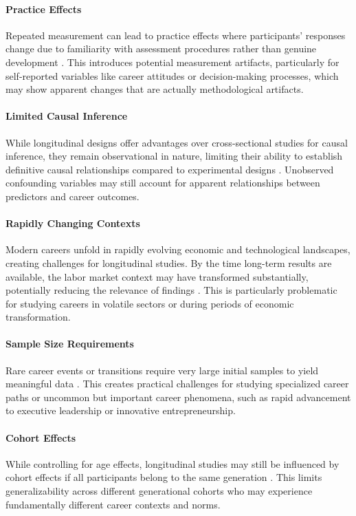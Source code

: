 \documentclass[../main.tex]{subfiles}
\begin{document}
\paragraph{Practice Effects}
Repeated measurement can lead to practice effects where participants' responses change due to familiarity with assessment procedures rather than genuine development \citep{wikipedia2024longitudinal}. This introduces potential measurement artifacts, particularly for self-reported variables like career attitudes or decision-making processes, which may show apparent changes that are actually methodological artifacts.

\paragraph{Limited Causal Inference}
While longitudinal designs offer advantages over cross-sectional studies for causal inference, they remain observational in nature, limiting their ability to establish definitive causal relationships compared to experimental designs \citep{wikipedia2024longitudinal}. Unobserved confounding variables may still account for apparent relationships between predictors and career outcomes.

\paragraph{Rapidly Changing Contexts}
Modern careers unfold in rapidly evolving economic and technological landscapes, creating challenges for longitudinal studies. By the time long-term results are available, the labor market context may have transformed substantially, potentially reducing the relevance of findings \citep{endvaw2024longitudinal}. This is particularly problematic for studying careers in volatile sectors or during periods of economic transformation.

\paragraph{Sample Size Requirements}
Rare career events or transitions require very large initial samples to yield meaningful data \citep{endvaw2024longitudinal}. This creates practical challenges for studying specialized career paths or uncommon but important career phenomena, such as rapid advancement to executive leadership or innovative entrepreneurship.

\paragraph{Cohort Effects}
While controlling for age effects, longitudinal studies may still be influenced by cohort effects if all participants belong to the same generation \citep{caruana2015longitudinal, wikipedia2024longitudinal}. This limits generalizability across different generational cohorts who may experience fundamentally different career contexts and norms.
\end{document}
